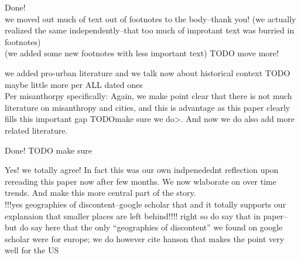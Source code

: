 Done!\\

we moved out much of text out of footnotes to the body--thank you!
(we actually realized the same independently--that too much of improtant text was burried in footnotes)\\
(we added some new footnotes with less important text)
TODO move more!

we added pro-urban literature and we talk now about historical context 
TODO maybe little more per ALL dated ones\\

Per misanthorpy specifically:
Again, we
make point clear that there is not much literature on misanthropy and cities,
and this is advantage as this paper clearly fills this important gap
TODOmake sure we do>.
And now we do also add more related literature. 
  


Done!
TODO make sure


Yes! we totally agree! In fact this was our own indpenedednt reflection upon
rereading this paper now after few months. We now wlaborate on over time
trends. And make this more central part of the story.\\

!!!yes geographies of discontent--google scholar that and it totally supports
our explanaion that smaller places are left behind!!!!
right so do say that in paper--but do say here that the only ``geographies of
discontent'' we found on google scholar were for europe; we do however cite
hanson that makes the point very well for the US\\

